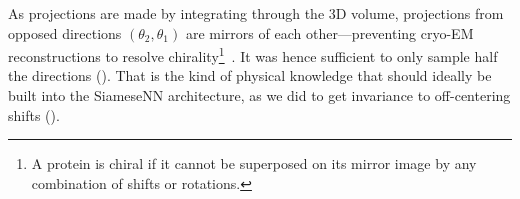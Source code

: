 As projections are made by integrating through the 3D volume, projections from opposed directions $(\theta_2,\theta_1)$ are mirrors of each other---preventing cryo-EM reconstructions to resolve chirality\footnote{A protein is chiral if it cannot be superposed on its mirror image by any combination of shifts or rotations.}~.
It was hence sufficient to only sample half the directions \banjac{$(\theta_2, \theta_1) \in [0, \pi[ \;  \times \; [0, \pi[ $} (). %
That is the kind of physical knowledge that should ideally be built into the SiameseNN architecture, as we did to get invariance to off-centering shifts ().

